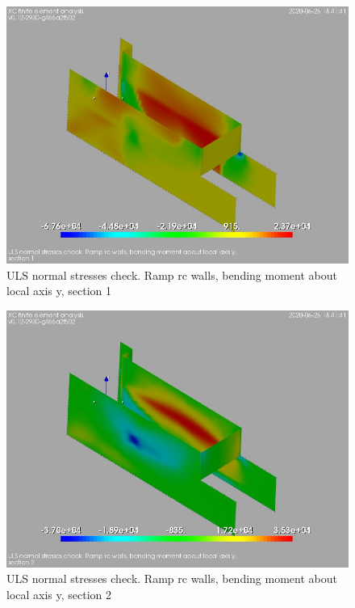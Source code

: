 \begin{figure}
\begin{center}
\includegraphics[width=\linewidth]{ramp_wall/resLC/text/graphics/normStrsULS/wallsMySect1}
\caption{ULS normal stresses check. Ramp rc walls, bending moment about local axis y, section 1}
\end{center}
\end{figure}
\begin{figure}
\begin{center}
\includegraphics[width=\linewidth]{ramp_wall/resLC/text/graphics/normStrsULS/wallsMySect2}
\caption{ULS normal stresses check. Ramp rc walls, bending moment about local axis y, section 2}
\end{center}
\end{figure}
